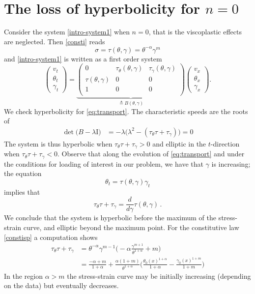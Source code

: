 \documentclass[11pt]{article}
\theoremstyle{remark}
\begin{document}
\section{The loss of hyperbolicity for $n = 0$} \label{append:hadamard}
Consider the system \eqref{intro-system1} when $n=0$, that is the viscoplastic effects are neglected. Then \eqref{consti} reads
\begin{equation}
\label{constisp}
\sigma = \tau (\theta, \gamma) = \theta^{-\alpha}\gamma^m
\end{equation}
and  \eqref{intro-system1} is written as a first order system
\begin{equation} \label{eq:transport}
 \begin{pmatrix} v_t \\ \theta_t \\ \gamma_t \end{pmatrix} = \underbrace{
 \begin{pmatrix}
 0 & \tau_\theta (\theta, \gamma) & \tau_\gamma (\theta, \gamma) \\
 \tau(\theta, \gamma) & 0 & 0 \\
  1 & 0 & 0 \\
 \end{pmatrix}}_\text{$\triangleq B (\theta, \gamma)$}
  \begin{pmatrix} v_x  \\ \theta_x \\  \gamma_x  \end{pmatrix}.
\end{equation}
We check hyperbolicity for  \eqref{eq:transport}. The characteristic speeds are the roots of
\begin{align*}
 \det\big(B-\lambda \textrm{I}\big) &= -\lambda \big(\lambda^2 - (\tau_\theta \tau + \tau_\gamma )\big)  = 0
 \end{align*}
 The system is thus hyperbolic when $\tau_\theta \tau + \tau_\gamma > 0$ and elliptic in the $t$-direction when $\tau_\theta \tau + \tau_\gamma < 0$.
 Observe that along the evolution of \eqref{eq:transport} and under the conditions for loading of interest in our problem, we have that
 $\gamma$ is increasing; the equation
 $$
 \theta_t = \tau(\theta, \gamma) \gamma_t
 $$
 implies that
 $$
 \tau_\theta \tau + \tau_\gamma = \frac{d}{d\gamma} \tau (\theta, \gamma) \, .
 $$
 We conclude that the system is hyperbolic  before  the maximum of the stress-strain curve,  and elliptic beyond the maximum point.
 For the constitutive law \eqref{constisp} a computation shows
 $$
 \begin{aligned}
 \tau_\theta  \tau + \tau_\gamma &= \theta^{-\alpha } \gamma^{m-1} \big ( -\alpha \frac{\gamma^{m+1}}{\theta^{1 + \alpha}} + m \big )
 \\
 &= \frac{-\alpha + m}{1 + \alpha} + \frac{\alpha (1+m)}{\theta^{1+\alpha}}
 \big (  \frac{\theta_0(x)^{1+\alpha}}{1 + \alpha} - \frac{ \gamma_0 (x)^{1+m}}{1+m} \big )
 \end{aligned}
 $$
In the region $\alpha > m$ the stress-strain curve may be initially increasing (depending on the data)
 but eventually decreases.
\end{document}
